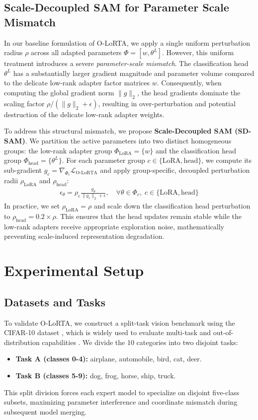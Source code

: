 \documentclass{article}
\theoremstyle{plain}
\theoremstyle{definition}
\theoremstyle{remark}
\begin{document}
\subsection{Scale-Decoupled SAM for Parameter Scale Mismatch}
\label{subsec:sd-sam}
In our baseline formulation of O-LoRTA, we apply a single uniform perturbation radius $\rho$ across all adapted parameters $\Phi = [w, \theta^L]$. However, this uniform treatment introduces a severe \emph{parameter-scale mismatch}. The classification head $\theta^L$ has a substantially larger gradient magnitude and parameter volume compared to the delicate low-rank adapter factor matrices $w$. Consequently, when computing the global gradient norm $\| g \|_2$, the head gradients dominate the scaling factor $\rho / (\| g \|_2 + \epsilon)$, resulting in over-perturbation and potential destruction of the delicate low-rank adapter weights.

To address this structural mismatch, we propose \textbf{Scale-Decoupled SAM (SD-SAM)}. We partition the active parameters into two distinct homogeneous groups: the low-rank adapter group $\Phi_{\text{LoRA}} = \{w\}$ and the classification head group $\Phi_{\text{head}} = \{\theta^L\}$. For each parameter group $c \in \{\text{LoRA}, \text{head}\}$, we compute its sub-gradient $g_c = \nabla_{\Phi_c} \mathcal{L}_{\text{O-LoRTA}}$ and apply group-specific, decoupled perturbation radii $\rho_{\text{LoRA}}$ and $\rho_{\text{head}}$:
\begin{align}
    \epsilon_{\theta} = \rho_c \frac{g_{\theta}}{\| g_c \|_2 + \epsilon}, \quad \forall \theta \in \Phi_c, \; c \in \{\text{LoRA}, \text{head}\}
\end{align}
In practice, we set $\rho_{\text{LoRA}} = \rho$ and scale down the classification head perturbation to $\rho_{\text{head}} = 0.2 \times \rho$. This ensures that the head updates remain stable while the low-rank adapters receive appropriate exploration noise, mathematically preventing scale-induced representation degradation.

\section{Experimental Setup}
\label{submission-experiments}
\subsection{Datasets and Tasks}
To validate O-LoRTA, we construct a split-task vision benchmark using the CIFAR-10 dataset \cite{krizhevsky2009learning}, which is widely used to evaluate multi-task and out-of-distribution capabilities \cite{hendrycks2020measuring}. We divide the 10 categories into two disjoint tasks:
\begin{itemize}
    \item \textbf{Task A (classes 0-4):} airplane, automobile, bird, cat, deer.
    \item \textbf{Task B (classes 5-9):} dog, frog, horse, ship, truck.
\end{itemize}
This split division forces each expert model to specialize on disjoint five-class subsets, maximizing parameter interference and coordinate mismatch during subsequent model merging.
\end{document}
